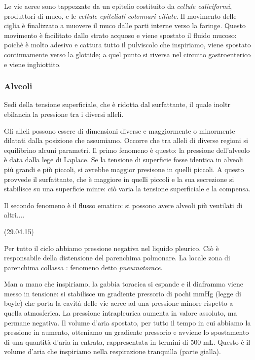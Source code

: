 \documentclass[a4paper,12pt]{article}
\begin{document}
Le vie aeree sono tappezzate da un epitelio costituito da \emph{cellule caliciformi}, produttori di muco, e le \emph{cellule epiteliali colonnari ciliate}. Il movimento delle ciglia è finalizzato a muovere il muco dalle parti interne verso la faringe. Questo movimento è facilitato dallo strato acquoso e viene spostato il fluido mucoso: poichè è molto adesivo e cattura tutto il pulviscolo che inspiriamo, viene spostato continuamente verso la glottide; a quel punto si riversa nel circuito gastroenterico e viene inghiottito.

\subsubsection{Alveoli}
 Sedi della tensione superficiale, che è ridotta dal surfattante, il quale inoltr ebilancia la pressione tra i diversi alleli.
 
Gli alleli possono essere di dimensioni diverse e maggiormente o minormente dilatati dalla posizione che assumiamo. Occorre che tra alleli di diverse regioni si equilibrino alcuni parametri. Il primo fenomeno è questo: la pressione dell'alveolo è data dalla lege di Laplace. Se la tensione di superficie fosse identica in alveoli più grandi e più piccoli, si avrebbe maggior presisone in quelli piccoli. A questo provvede il surfattante, che è maggiore in quelli piccoli e la sua secrezione si stabilisce su una superficie minre: ciò varia la tensione superficiale e la compensa.
 
 Il secondo fenomeno è il flusso ematico: si possono avere alveoli più ventilati di altri....
 
 (29.04.15)
 

 Per tutto il ciclo abbiamo pressione negativa nel liquido pleurico. Ciò è responsabile della distensione del parenchima polmonare. La locale zona di parenchima collassa : fenomeno detto \emph{pneumotorace}.

Man a mano che inspiriamo, la gabbia toracica si espande e il diaframma viene messo in tensione: si stabilisce un gradiente pressorio di pochi mmHg (legge di boyle) che porta la cavità delle vie aeree ad una pressione minore rispetto a quella atmosferica. La pressione intrapleurica aumenta in valore assoluto, ma permane negativa. Il volume d'aria spostato, per tutto il tempo in cui abbiamo la pressione in aumento, otteniamo un gradiente pressorio e avviene lo spostamento di una quantità d'aria in entrata, rappresentata in termini di 500 mL. Questo è il volume d'aria che inspiriamo nella respirazione tranquilla (parte gialla).
\end{document}
